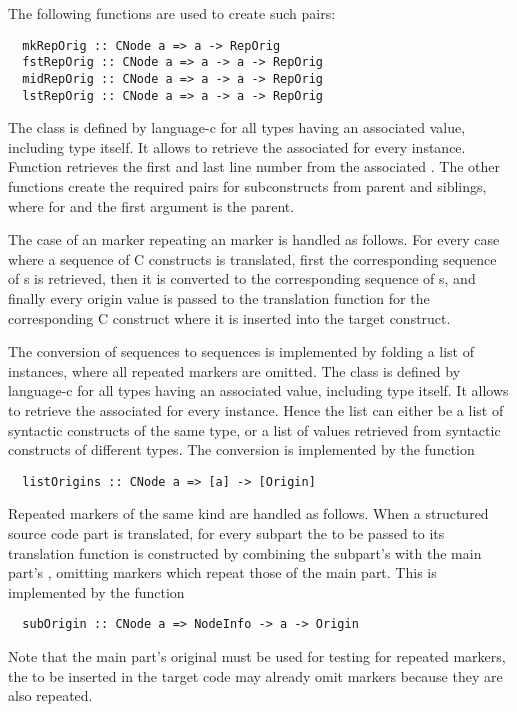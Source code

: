 The following functions are used to create such pairs:
\begin{verbatim}
  mkRepOrig :: CNode a => a -> RepOrig
  fstRepOrig :: CNode a => a -> a -> RepOrig
  midRepOrig :: CNode a => a -> a -> RepOrig
  lstRepOrig :: CNode a => a -> a -> RepOrig
\end{verbatim}
The  class is defined by language-c for all types 
having an associated  value, including type  itself. It allows to retrieve the 
associated  for every instance. 
Function  retrieves the first and last line number from the associated . 
The other functions create the required pairs for subconstructs from parent and siblings, where for 
 and  the first argument is the parent.


The case of an  marker repeating an  marker is handled as follows. For every case where 
a sequence of C constructs is translated, first the corresponding sequence of s is retrieved, then it is 
converted to the corresponding sequence of s, and finally every origin value is passed to the translation 
function for the corresponding C construct where it is inserted into the target construct. 

The conversion of  sequences to  sequences is implemented by folding a list of 
instances, where all repeated markers are omitted. The  class is defined by language-c for all types 
having an associated  value, including type  itself. It allows to retrieve the 
associated  for every instance. Hence the list can either be
a list of syntactic constructs of the same type, or a list of  values retrieved from syntactic 
constructs of different types. The conversion is implemented by the function
\begin{verbatim}
  listOrigins :: CNode a => [a] -> [Origin]
\end{verbatim}

Repeated markers of the same kind are handled as follows. When a structured source code part is translated, for every
subpart the  to be passed to its translation function is constructed by combining the subpart's 
 with the main part's , omitting markers which repeat those of the main part. 
This is implemented by the function
\begin{verbatim}
  subOrigin :: CNode a => NodeInfo -> a -> Origin
\end{verbatim}
Note that the main part's original  must be used for testing for repeated markers, the  
to be inserted in the target code may already omit markers because they are also repeated.

